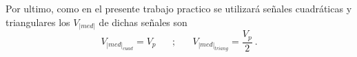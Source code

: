             \noindent Por ultimo, como en el presente trabajo practico se 
            utilizará señales cuadráticas y triangulares los \(V_{|med|}\)
            de dichas señales son
            \begin{equation*}
                V_{|med|_{cuad}} = V_p \hspace{20pt};\hspace{20pt} 
                V_{|med|_{triang}} = \dfrac{V_p}{2}~.
            \end{equation*}
